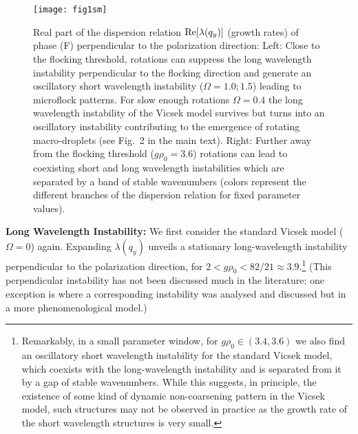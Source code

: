 \documentclass[aps,twocolumn,showlabels,showrefs,amsmath,amssymb,pre,superscriptaddress, floatfix, colors]{revtex4}
\newcommand{\1}{\begin{equation}}
\newcommand{\2}{\end{equation}}
\newcommand{\4}[2]{{\frac{#1}{#2}}}
\begin{document}
\begin{figure}
\begin{center}
\texttt{[image: fig1sm]}
\end{center}
\caption{\small Real part of the dispersion relation ${\rm Re}[\lambda(q_y)]$ (growth rates) of phase (F) perpendicular to the polarization direction: 
Left: Close to the flocking threshold, rotations can suppress the long wavelength instability perpendicular to the flocking direction and generate 
an oscillatory short wavelength instability ($\Omega=1.0; 1.5$) leading to microflock patterns. For slow enough rotations $\Omega=0.4$ the long wavelength instability of the Vicsek model survives but turns into an 
oscillatory instability contributing to the emergence of rotating macro-droplets (see Fig.~2 in the main text). 
Right: Further away from the flocking threshold ($g\rho_0=3.6$) rotations can lead to coexisting short and long wavelength instabilities which are separated by a 
band of stable wavenumbers (colors represent the different branches of the dispersion relation for fixed parameter values).} 
\label{fig1sm}
\end{figure}

\vspace{0.5cm}
\textbf{Long Wavelength Instability:}
We first consider the standard Vicsek model ($\Omega=0$) again. Expanding $\lambda(q_y)$ unveils a stationary long-wavelength instability 
perpendicular to the polarization direction, for $2<g\rho_0<82/21 \approx 3.9$.\footnote{
Remarkably, in a small parameter window, for $g\rho_0 \in (3.4,3.6)$ we also find an oscillatory short wavelength instability for the standard Vicsek model, which coexists with the 
long-wavelength instability and is separated from it by a gap of stable wavenumbers. While this suggests, in principle, the existence of some kind of dynamic non-coarsening pattern 
in the Vicsek model, such structures may not be observed in practice as the growth rate of the short wavelength structures is very small.}
(This perpendicular instability has not been discussed much in the literature; one exception is \cite{Gopinath2012sm} 
where a corresponding instability was analysed and discussed but in a more phenomenological model.)
\end{document}
